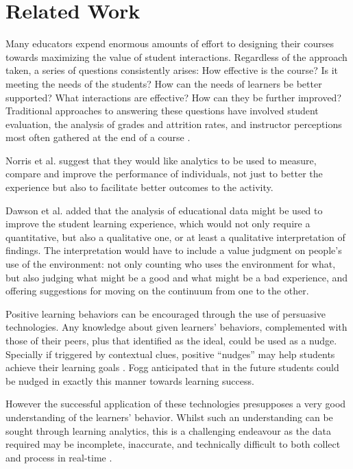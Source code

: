 \section{Related Work}
Many educators expend enormous amounts of effort to designing their
courses towards maximizing the value of student
interactions. Regardless of the approach taken, a series of questions
consistently arises: How effective is the course? Is it meeting the
needs of the students? How can the needs of learners be better
supported? What interactions are effective? How can they be further
improved? Traditional approaches to answering these questions have
involved student evaluation, the analysis of grades and attrition
rates, and instructor perceptions most often gathered at the end of a
course \cite{tayl16_1}.

Norris et al. \cite{campbell2007academic} suggest that they would like
analytics to be used to measure, compare and improve the performance
of individuals, not just to better the experience but also to
facilitate better outcomes to the activity.

Dawson et al. \cite{doi} added that the analysis of educational data
might be used to improve the student learning experience, which would
not only require a quantitative, but also a qualitative one, or at
least a qualitative interpretation of findings. The interpretation
would have to include a value judgment on people's use of the
environment: not only counting who uses the environment for what, but
also judging what might be a good and what might be a bad experience,
and offering suggestions for moving on the continuum from one to the
other.

Positive learning behaviors can be encouraged through the use of
persuasive technologies. Any knowledge about given learners'
behaviors, complemented with those of their peers, plus that
identified as the ideal, could be used as a nudge. Specially if
triggered by contextual clues, positive ``nudges'' may help students
achieve their learning goals \cite{wilde2016understanding}. Fogg
\cite{Fogg} anticipated that in the future students could be nudged in
exactly this manner towards learning success.

However the successful application of these technologies presupposes a
very good understanding of the learners’ behavior. Whilst such an
understanding can be sought through learning analytics, this is a
challenging endeavour as the data required may be incomplete,
inaccurate, and technically difficult to both collect and process in
real-time \cite{wilde2016understanding}. 

